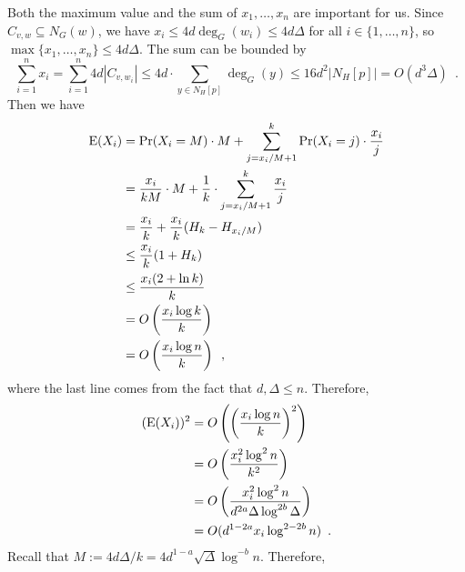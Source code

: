 \documentclass{patmorin}
\begin{document}
Both the maximum value and the sum of $x_1,\ldots,x_n$ are important for us.  Since $C_{v,w}\subseteq N_G(w)$, we have $x_i\le 4d\deg_G(w_i)\le 4d\Delta$ for all $i\in\{1,\ldots,n\}$, so $\max\{x_1,\ldots,x_n\}\le 4d\Delta$. The sum can be bounded by
\[
  \sum_{i=1}^n x_i
    = \sum_{i=1}^n 4d|C_{v,w_i}|
    \le 4d\cdot \sum_{y\in N_{H}[p]} \deg_{G}(y)
    \le 16d^2|N_{H}[p]|=O(d^3\Delta)
  \enspace .
\]
Then we have
\begin{align*}
  \mathrm{E}(X_i)
  & =\Pr(X_i=M)\cdot M + \sum_{j=x_i/M+1}^k \Pr(X_i=j)\cdot\frac{x_i}{j} \\
  & =\frac{x_i}{kM}\cdot M + \frac{1}{k}\cdot\sum_{j=x_i/M+1}^k \frac{x_i}{j} \\
  & = \frac{x_i}{k} + \frac{x_i}{k}(H_{k}-H_{x_i/M}) \\
  & \le \frac{x_i}{k}(1+H_{k}) \\
  & \le \frac{x_i(2+\ln k)}{k} \\
  & = O\left(\frac{x_i\log k}{k}\right) \\
  & = O\left(\frac{x_i\log n}{k}\right)
  \enspace ,
\end{align*}
where the last line comes from the fact that $d,\Delta \le n$.
Therefore,
\begin{align*}
  (\mathrm{E}(X_i))^2
  & = O\left(\left(\frac{x_i\log n}{k}\right)^2\right) \\
  & = O\left(\frac{x_i^2\log^2 n}{k^2}\right) \\
  & = O\left(\frac{x_i^2\log^2 n}{d^{2a}\Delta\log^{2b}\Delta}\right) \\
  & = O(d^{1-2a}x_i\log^{2-2b} n) \enspace .
\end{align*}
Recall that $M:=4d\Delta/k=4d^{1-a}\sqrt{\Delta}\log^{-b}n$. Therefore,
\end{document}
